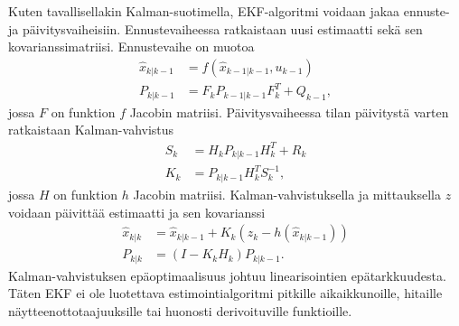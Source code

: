 Kuten tavallisellakin Kalman-suotimella, EKF-algoritmi voidaan jakaa ennuste- ja päivitysvaiheisiin. 
Ennustevaiheessa ratkaistaan uusi estimaatti sekä sen kovarianssimatriisi. Ennustevaihe on muotoa
\begin{align}
    \hat{x}_{k|k-1} &= f(\hat{x}_{k-1|k-1}, u_{k-1}) \\
    P_{k|k-1} &= F_k P_{k-1|k-1} F_k^T + Q_{k-1},
\end{align}
jossa \(F\) on funktion \(f\) Jacobin matriisi. 
Päivitysvaiheessa tilan päivitystä varten ratkaistaan Kalman-vahvistus
\begin{align}
    S_k &= H_k P_{k|k-1} H_k^T + R_k \\
    K_k &= P_{k|k-1} H_k^T S_k^{-1},
\end{align}
jossa \(H\) on funktion \(h\) Jacobin matriisi. Kalman-vahvistuksella ja mittauksella \(z\) voidaan päivittää estimaatti ja sen kovarianssi
\begin{align}
    \hat{x}_{k|k} &= \hat{x}_{k|k-1} + K_k (z_k - h(\hat{x}_{k|k-1})) \\
    P_{k|k} &= (I-K_k H_k) P_{k|k-1}.
\end{align}
Kalman-vahvistuksen epäoptimaalisuus johtuu linearisointien epätarkkuudesta. Täten EKF ei ole luotettava estimointialgoritmi pitkille aikaikkunoille, hitaille näytteenottotaajuuksille tai huonosti derivoituville funktioille.